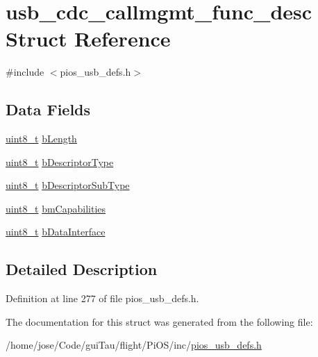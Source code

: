 \hypertarget{structusb__cdc__callmgmt__func__desc}{\section{usb\-\_\-cdc\-\_\-callmgmt\-\_\-func\-\_\-desc Struct Reference}
\label{structusb__cdc__callmgmt__func__desc}
}


{\ttfamily \#include $<$pios\-\_\-usb\-\_\-defs.\-h$>$}

\subsection*{Data Fields}
\begin{DoxyCompactItemize}
\item 
\hyperlink{stdint_8h_aba7bc1797add20fe3efdf37ced1182c5}{uint8\-\_\-t} \hyperlink{group___p_i_o_s___u_s_b___d_e_f_s_ga987115acb21ed11d7cf4255dc3224efb}{b\-Length}
\item 
\hyperlink{stdint_8h_aba7bc1797add20fe3efdf37ced1182c5}{uint8\-\_\-t} \hyperlink{group___p_i_o_s___u_s_b___d_e_f_s_gaeec8cc78a5f92025f5599a0f82a33b77}{b\-Descriptor\-Type}
\item 
\hyperlink{stdint_8h_aba7bc1797add20fe3efdf37ced1182c5}{uint8\-\_\-t} \hyperlink{group___p_i_o_s___u_s_b___d_e_f_s_ga7939fdf3f4d0475126d3b6055a11e7bb}{b\-Descriptor\-Sub\-Type}
\item 
\hyperlink{stdint_8h_aba7bc1797add20fe3efdf37ced1182c5}{uint8\-\_\-t} \hyperlink{group___p_i_o_s___u_s_b___d_e_f_s_ga48fbc5fa8369d703a7bdc6c51400cbeb}{bm\-Capabilities}
\item 
\hyperlink{stdint_8h_aba7bc1797add20fe3efdf37ced1182c5}{uint8\-\_\-t} \hyperlink{group___p_i_o_s___u_s_b___d_e_f_s_ga9b0af922aee941d19a36f9cc309e0094}{b\-Data\-Interface}
\end{DoxyCompactItemize}


\subsection{Detailed Description}


Definition at line 277 of file pios\-\_\-usb\-\_\-defs.\-h.



The documentation for this struct was generated from the following file\-:\begin{DoxyCompactItemize}
\item 
/home/jose/\-Code/gui\-Tau/flight/\-Pi\-O\-S/inc/\hyperlink{pios__usb__defs_8h}{pios\-\_\-usb\-\_\-defs.\-h}\end{DoxyCompactItemize}
